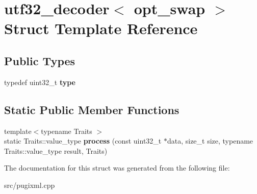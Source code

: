 \hypertarget{structutf32__decoder}{}\section{utf32\+\_\+decoder$<$ opt\+\_\+swap $>$ Struct Template Reference}
\label{structutf32__decoder}
\subsection*{Public Types}
\begin{DoxyCompactItemize}
\item 
\mbox{\label{structutf32__decoder_a817a1ba432d377e183ece6d448b7418d}} 
typedef uint32\+\_\+t {\bfseries type}
\end{DoxyCompactItemize}
\subsection*{Static Public Member Functions}
\begin{DoxyCompactItemize}
\item 
\mbox{\label{structutf32__decoder_ac23eaccb8e66b323c3509b0c2307bc3f}} 
{\footnotesize template$<$typename Traits $>$ }\\static Traits\+::value\+\_\+type {\bfseries process} (const uint32\+\_\+t $\ast$data, size\+\_\+t size, typename Traits\+::value\+\_\+type result, Traits)
\end{DoxyCompactItemize}


The documentation for this struct was generated from the following file\+:\begin{DoxyCompactItemize}
\item 
src/pugixml.\+cpp\end{DoxyCompactItemize}
